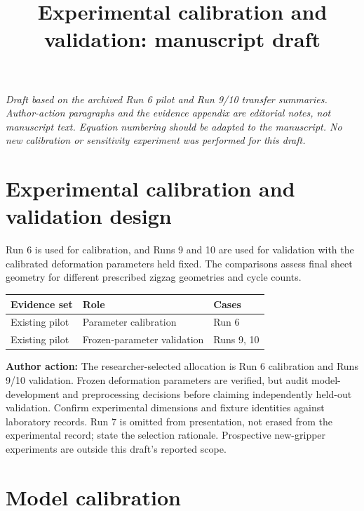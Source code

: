 \documentclass[11pt]{article}
\newcommand{\pending}[1]{\par\noindent\textbf{Author action:} #1\par}
\begin{document}
\title{Experimental calibration and validation: manuscript draft}
\author{}\date{}\maketitle
\noindent\textit{Draft based on the archived Run 6 pilot and Run 9/10 transfer summaries. Author-action paragraphs and the evidence appendix are editorial notes, not manuscript text. Equation numbering should be adapted to the manuscript. No new calibration or sensitivity experiment was performed for this draft.}

\section*{Experimental calibration and validation design}
Run 6 is used for calibration, and Runs 9 and 10 are used for validation with the calibrated deformation parameters held fixed. The comparisons assess final sheet geometry for different prescribed zigzag geometries and cycle counts.

\begin{center}
\begin{tabular}{lll}\toprule
Evidence set & Role & Cases \\\midrule
Existing pilot & Parameter calibration & Run 6 \\
Existing pilot & Frozen-parameter validation & Runs 9, 10 \\\bottomrule
\end{tabular}
\end{center}
\pending{The researcher-selected allocation is Run 6 calibration and Runs 9/10 validation. Frozen deformation parameters are verified, but audit model-development and preprocessing decisions before claiming independently held-out validation. Confirm experimental dimensions and fixture identities against laboratory records. Run 7 is omitted from presentation, not erased from the experimental record; state the selection rationale. Prospective new-gripper experiments are outside this draft's reported scope.}

\setcounter{section}{3}
\section{Model calibration}
\end{document}
